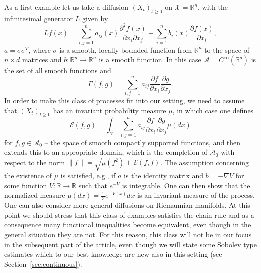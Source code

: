 \documentclass[a4paper]{amsart}
\theoremstyle{definition}
\theoremstyle{remark}
\numberwithin{equation}{section}
\newcommand*{\RR}{\mathbb{R}}
\newcommand*{\calA}{\mathcal{A}}
\newcommand*{\calE}{\mathcal{E}}
\begin{document}
As a first example let us take a diffusion $(X_t)_{t\ge 0}$ on $\mathcal{X} = \RR^n$, with the infinitesimal generator $L$ given by
\begin{displaymath}
  Lf (x) = \sum_{i,j=1}^n a_{ij}(x)\frac{\partial^2 f(x)}{\partial x_i\partial x_j} + \sum_{i=1}^n b_i(x)\frac{\partial f(x)}{\partial x_i},
\end{displaymath}
$a = \sigma\sigma^T$, where $\sigma$ is a smooth, locally bounded function from $\RR^n$ to the space of $n\times d$ matrices and $b\colon \RR^n\to \RR^n$ is a smooth function.
In this case $\calA = C^\infty(\RR^d)$ is the set of all smooth functions and
\begin{displaymath}
  \Gamma(f,g) = \sum_{i,j=1}^n a_{ij} \frac{\partial f}{\partial x_i}\frac{\partial g}{\partial x_j}.
\end{displaymath}
In order to make this class of processes fit into our setting, we need to assume that $(X_t)_{t\ge 0}$ has an invariant probability measure $\mu$, in which case one defines
\begin{displaymath}
  \calE(f,g) = \int_{\mathcal{X}} \sum_{i,j=1}^n a_{ij} \frac{\partial f}{\partial x_i}\frac{\partial g}{\partial x_j} \mu(dx)
\end{displaymath}
for $f,g \in \calA_0$ -- the space of smooth compactly supported functions, and then extends this to an appropriate domain, which is the completion of $\calA_0$ with respect to the norm $\|f\| = \sqrt{\mu(f^2) + \calE(f,f)}$.
The assumption concerning the existence of $\mu$ is satisfied, e.g., if $a$ is the identity matrix and $b = - \nabla V$ for some function $V \colon \RR \to \RR$ such that $e^{-V}$ is integrable. One can then show that  the normalized measure $\mu(dx) = \frac{1}{Z}e^{-V(x)}dx$ is an invariant measure of the process. One can also consider more general diffusions on Riemannian manifolds.
At this point we should stress that this class of examples satisfies the chain rule and as a consequence many functional inequalities become equivalent, even though in the general situation they are not. For this reason, this class will not be in our focus in the subsequent part of the article, even though we will state some Sobolev type estimates which to our best knowledge are new also in this setting (see Section~\ref{sec:continuous}).

\medskip
\end{document}
